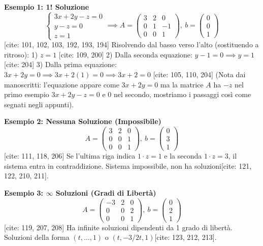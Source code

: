 \documentclass[11pt,a4paper]{article}
\begin{document}
\begin{esercizio}
\textbf{Esempio 1: 1! Soluzione}
$$
\begin{cases} 3x + 2y - z = 0 \\ y - z = 0 \\ z = 1 \end{cases} \implies
A = \begin{pmatrix} 3 & 2 & 0 \\ 0 & 1 & -1 \\ 0 & 0 & 1 \end{pmatrix}, \ b = \begin{pmatrix} 0 \\ 0 \\ 1 \end{pmatrix}
$$
[cite: 101, 102, 103, 192, 193, 194]
Risolvendo dal basso verso l'alto (sostituendo a ritroso):
1) $z = 1$ [cite: 109, 200]
2) Dalla seconda equazione: $y - 1 = 0 \implies y = 1$ [cite: 204]
3) Dalla prima equazione: $3x + 2y = 0 \implies 3x + 2(1) = 0 \implies 3x + 2 = 0$ [cite: 105, 110, 204] 
(Nota dai manoscritti: l'equazione appare come $3x+2y=0$ ma la matrice $A$ ha $-z$ nel primo esempio $3x+2y-z=0$ e $0$ nel secondo, mostriamo i passaggi così come segnati negli appunti).

\textbf{Esempio 2: Nessuna Soluzione (Impossibile)}
$$
A = \begin{pmatrix} 3 & 2 & 0 \\ 0 & 0 & 1 \\ 0 & 0 & 1 \end{pmatrix}, \ b = \begin{pmatrix} 0 \\ 3 \\ 1 \end{pmatrix}
$$
[cite: 111, 118, 206]
Se l'ultima riga indica $1 \cdot z = 1$ e la seconda $1 \cdot z = 3$, il sistema entra in contraddizione. Sistema impossibile, non ha soluzioni[cite: 121, 122, 210, 211].

\textbf{Esempio 3: $\infty$ Soluzioni (Gradi di Libertà)}
$$
A = \begin{pmatrix} -3 & 2 & 0 \\ 0 & 0 & 2 \\ 0 & 0 & 1 \end{pmatrix}, \ b = \begin{pmatrix} 0 \\ 2 \\ 1 \end{pmatrix}
$$
[cite: 119, 207, 208]
Ha infinite soluzioni dipendenti da 1 grado di libertà. Soluzioni della forma $(t, \dots, 1)$ o $(t, -3/2 t, 1)$[cite: 123, 212, 213].
\end{esercizio}
\end{document}
